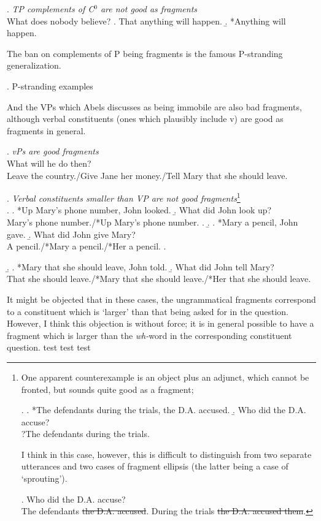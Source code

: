 \documentclass[11pt,letterpaper]{article}
\begin{document}
 \ex. 	{\it TP complements of C$^0$ are not good as fragments}\\
 	What does nobody believe?
 	\a. That anything will happen.
 	\b. *Anything will happen.
 	
 The ban on complements of P being fragments is the famous P-stranding generalization.
 
 \ex. 	P-stranding examples %
 
 And the VPs which Abels discusses as being immobile are also bad fragments, although verbal constituents (ones which plausibly include v) are good as fragments in general.
 
 \ex. 	{\it vPs are good fragments}\\
 	What will he do then?\\
 	Leave the country./Give Jane her money./Tell Mary that she should leave.
 	
 \ex. 	{\it Verbal constituents smaller than VP are not good fragments}\footnote{One apparent counterexample is an object plus an adjunct, which cannot be fronted, but sounds quite good as a fragment;
 
 \ex.	\a. *The defendants during the trials, the D.A. accused.
 	\b. Who did the D.A. accuse?\\
 		?The defendants during the trials.
 
 I think in this case, however, this is difficult to distinguish from two separate utterances and two cases of fragment ellipsis (the latter being a case of `sprouting').
 
 \ex.	Who did the D.A. accuse?\\
 	The defendants \sout{the D.A. accused}. During the trials \sout{the D.A. accused them}.
 	
 {}
 
 }\\
 	\a. 	\a. *Up Mary's phone number, John looked.
 		\b. What did John look up?\\
 			Mary's phone number./*Up Mary's phone number.
 		\z.
 	\b.	\a. *Mary a pencil, John gave.
 		\b. What did John give Mary?\\
 			A pencil./*Mary a pencil./*Her a pencil.
 		\z.

 	\b. 	\a. *Mary that she should leave, John told.
 		\b. What did John tell Mary?\\
 			That she should leave./*Mary that she should leave./*Her that she should leave.
 
 It might be objected that in these cases, the ungrammatical fragments correspond to a constituent which is `larger' than that being asked for in the question.
 However, I think this objection is without force; it is in general possible to have a fragment which is larger than the {\it wh-}word in the corresponding constituent question.
 test test test 
 
 
\end{document}
